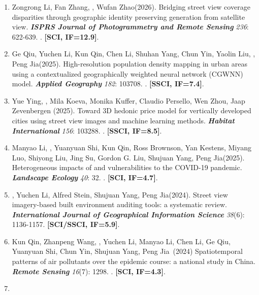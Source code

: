 \begin{enumerate}
\item
    Zongrong Li, Fan Zhang, \Shaoqing\CS, Wufan Zhao\CS (2026).
    Bridging street view coverage disparities through geographic identity preserving generation from satellite view.
    \textbf{\textit{ISPRS Journal of Photogrammetry and Remote Sensing}} \textit{236}: 622-639.
    . \textbf{[SCI, IF=12.9]}.
\item    
    Ge Qiu, Yuchen Li, Kun Qin, Chen Li, Shuhan Yang, Chun Yin, Yaolin Liu\CS, \Shaoqing\CS, Peng Jia\CS (2025).
    High-resolution population density mapping in urban areas using a contextualized geographically weighted neural network (CGWNN) model. 
    \textbf{\textit{Applied Geography}} \textit{182}: 103708.
    . \textbf{[SSCI, IF=7.4]}.
\item    
    Yue Ying, \Shaoqing\CS, Mila Koeva, Monika Kuffer, Claudio Persello, Wen Zhou, Jaap Zevenbergen (2025).
    Toward 3D hedonic price model for vertically developed cities using street view images and machine learning methods. 
    \textbf{\textit{Habitat International}} \textit{156}: 103288.
    .
    \textbf{[SSCI, IF=8.5]}.
\item    
    Manyao Li\CF, \Shaoqing\CF, Yuanyuan Shi\CF, Kun Qin\CF, Ross Brownson, Yan Kestens, Miyang Luo, Shiyong Liu, Jing Su, Gordon G. Liu, Shujuan Yang\CS, Peng Jia\CS (2025).
    Heterogeneous impacts of and vulnerabilities to the COVID-19 pandemic. 
    \textbf{\textit{Landscape Ecology}} \textit{40}: 32.
    .
    \textbf{[SCI, IF=4.7]}.
\item
    \Shaoqing, Yuchen Li, Alfred Stein, Shujuan Yang, Peng Jia\CS (2024).
    Street view imagery-based built environment auditing tools: a systematic review. 
    \textbf{\textit{International Journal of Geographical Information Science}} \textit{38}(6): 1136-1157.
    \textbf{[SCI/SSCI, IF=5.9]}.
\item
     Kun Qin\CF, Zhanpeng Wang\CF, \Shaoqing\CF, Yuchen Li, Manyao Li, Chen Li, Ge Qiu, Yuanyuan Shi, Chun Yin, Shujuan Yang, Peng Jia\CS \ (2024)
    Spatiotemporal patterns of air pollutants over the epidemic course: a national study in China. 
    \textbf{\textit{Remote Sensing}} \textit{16}(7): 1298.
    . 
    \textbf{[SCI, IF=4.3]}.
\item

\end{enumerate}
